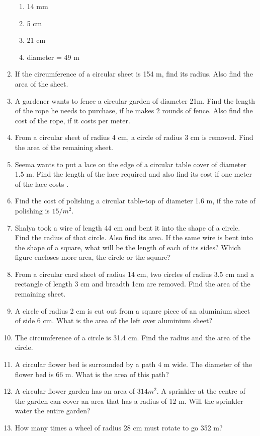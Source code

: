 \begin{enumerate}[label=\thesection.\arabic*, ref=\thesection.\theenumi]
\begin{enumerate}
\item 14 mm 
\item 5 cm
\item 21 cm 
\item  diameter = 49 m
\end{enumerate}
\item If the circumference of a circular sheet is 154 m, find its radius. Also find the area of the sheet. 
\item A gardener wants to fence a circular garden of diameter 21m. Find the length of the rope he needs to purchase, if he makes 2 rounds of fence. Also find the cost of the rope, if it costs  per meter. 
\item  From a circular sheet of radius 4 cm, a circle of radius 3 cm is removed. Find the area of the remaining sheet. 
\item Seema wants to put a lace on the edge of a circular table cover of diameter 1.5 m. Find the length of the lace required and also find its cost if one meter of the lace costs
. 
\item Find the cost of polishing a circular table-top of diameter 1.6 m, if the rate of polishing is \rupee $15/m^2$. 
\item Shalya took a wire of length 44 cm and bent it into the shape of a circle. Find the radius of that circle. Also find its area. If the same wire is bent into the shape of a square, what will be the length of each of its sides? Which figure encloses more
area, the circle or the square? 
\item From a circular card sheet of radius 14 cm, two circles of radius 3.5 cm and a rectangle of length 3 cm and breadth 1cm are removed. 
 Find the area of the remaining sheet. 
\item A circle of radius 2 cm is cut out from a square piece of an aluminium sheet of side 6 cm. What is the area of the left over aluminium sheet? 
\item  The circumference of a circle is 31.4 cm. Find the radius and the area of the circle. 
\item A circular flower bed is surrounded by a path 4 m wide. The diameter of the flower bed is 66 m. What is the area of this path? 
\item A circular flower garden has an area of $314 m^2$. A sprinkler at the centre of the garden can cover an area that has a radius of 12 m. Will the sprinkler water the entire garden? 
\item How many times a wheel of radius 28 cm must rotate to go 352 m? 

\end{enumerate}
